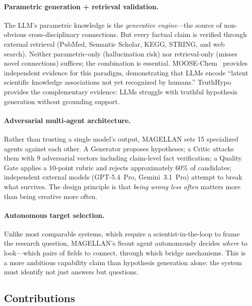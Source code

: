 \paragraph{Parametric generation + retrieval validation.} The LLM's parametric knowledge is the \emph{generative engine}---the source of non-obvious cross-disciplinary connections. But every factual claim is verified through external retrieval (PubMed, Semantic Scholar, KEGG, STRING, and web search). Neither parametric-only (hallucination risk) nor retrieval-only (misses novel connections) suffices; the combination is essential. MOOSE-Chem~\citep{yang2024moosechem} provides independent evidence for this paradigm, demonstrating that LLMs encode ``latent scientific knowledge associations not yet recognized by humans.'' TruthHypo~\citep{xiong2025} provides the complementary evidence: LLMs struggle with truthful hypothesis generation without grounding support.

\paragraph{Adversarial multi-agent architecture.} Rather than trusting a single model's output, MAGELLAN sets 15 specialized agents against each other. A Generator proposes hypotheses; a Critic attacks them with 9 adversarial vectors including claim-level fact verification; a Quality Gate applies a 10-point rubric and rejects approximately 60\% of candidates; independent external models (GPT-5.4~Pro, Gemini~3.1~Pro) attempt to break what survives. The design principle is that \emph{being wrong less often} matters more than being creative more often.

\paragraph{Autonomous target selection.} Unlike most comparable systems, which require a scientist-in-the-loop to frame the research question, MAGELLAN's Scout agent autonomously decides \emph{where} to look---which pairs of fields to connect, through which bridge mechanisms. This is a more ambitious capability claim than hypothesis generation alone: the system must identify not just answers but questions.

\subsection{Contributions}

